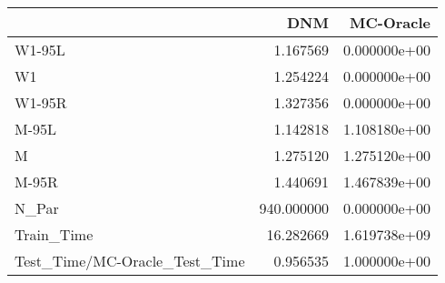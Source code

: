 \begin{tabular}{lrr}
\toprule
{} &         DNM &     MC-Oracle \\
\midrule
W1-95L                        &    1.167569 &  0.000000e+00 \\
W1                            &    1.254224 &  0.000000e+00 \\
W1-95R                        &    1.327356 &  0.000000e+00 \\
M-95L                         &    1.142818 &  1.108180e+00 \\
M                             &    1.275120 &  1.275120e+00 \\
M-95R                         &    1.440691 &  1.467839e+00 \\
N\_Par                         &  940.000000 &  0.000000e+00 \\
Train\_Time                    &   16.282669 &  1.619738e+09 \\
Test\_Time/MC-Oracle\_Test\_Time &    0.956535 &  1.000000e+00 \\
\bottomrule
\end{tabular}
